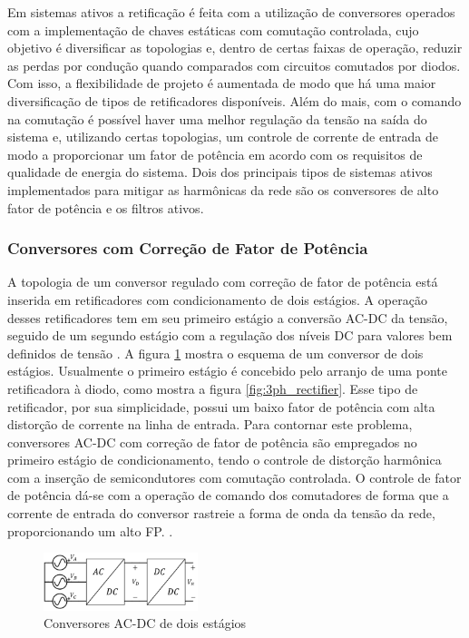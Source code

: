 Em sistemas ativos a retificação é feita com a utilização de conversores operados com a implementação de chaves estáticas com comutação controlada, cujo objetivo é diversificar as topologias e, dentro de certas faixas de operação, reduzir as perdas por condução quando comparados com circuitos comutados por diodos. Com isso, a flexibilidade de projeto é aumentada de modo que há uma maior diversificação de tipos de retificadores disponíveis. Além do mais, com o comando na comutação é possível haver uma melhor regulação da tensão na saída do sistema e, utilizando certas topologias, um controle de corrente de entrada de modo a proporcionar um fator de potência em acordo com os requisitos de qualidade de energia do sistema. Dois dos principais tipos de sistemas ativos implementados para mitigar as harmônicas da rede são os conversores de alto fator de potência e os filtros ativos.

\subsubsection{Conversores com Correção de Fator de Potência}

A topologia de um conversor regulado com correção de fator de potência está inserida em retificadores com condicionamento de dois estágios. A operação desses retificadores tem em seu primeiro estágio a conversão AC-DC da tensão, seguido de um segundo estágio com a regulação dos níveis DC para valores bem definidos de tensão \cite{Kolar2011}. A figura \ref{fig:rectifier_sch} mostra o esquema de um conversor de dois estágios. Usualmente o primeiro estágio é concebido pelo arranjo de uma ponte retificadora à diodo, como mostra a figura \ref{fig:3ph_rectifier}. Esse tipo de retificador, por sua simplicidade, possui um baixo fator de potência com alta distorção de corrente na linha de entrada. Para contornar este problema, conversores AC-DC com correção de fator de potência são empregados no primeiro estágio de condicionamento, tendo o controle de distorção harmônica com a inserção de semicondutores com comutação controlada. O controle de fator de potência dá-se com a operação de comando dos comutadores de forma que a corrente de entrada do conversor rastreie a forma de onda da tensão da rede, proporcionando um alto FP. \cite{Kolar2011,Barbosa2002}.

\begin{figure}[!htbp] %
	\centering
	\includegraphics[width=0.4\textwidth]{Cap2/Figuras/rectifier_sch.png}
	\caption{Conversores AC-DC de dois estágios}
	\label{fig:rectifier_sch}
\end{figure}

